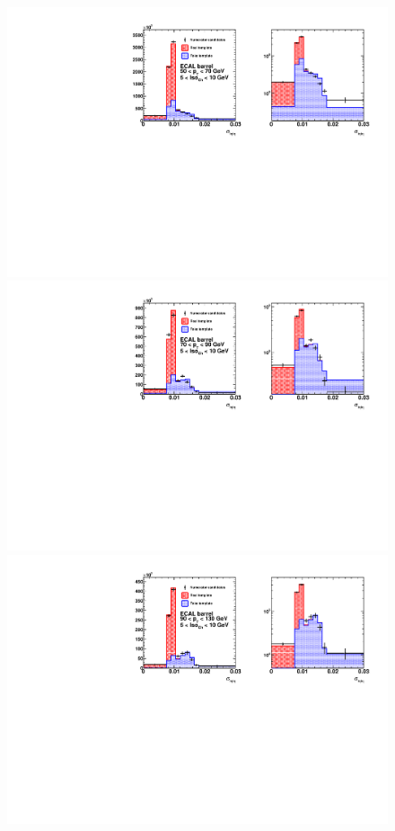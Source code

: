 \begin{figure}[!htbp]
	\noindent
	\centering
	\begin{multicols}{2}
		\includegraphics[scale=0.41]{figures/closure_test_h_pt50To70_chIso5To10_EB_Fake_sieie.pdf} \\
		\includegraphics[scale=0.41]{figures/closure_test_h_pt70To90_chIso5To10_EB_Fake_sieie.pdf} \\
		\includegraphics[scale=0.41]{figures/closure_test_h_pt90To130_chIso5To10_EB_Fake_sieie.pdf} \\

\end{multicols}
\end{figure}
